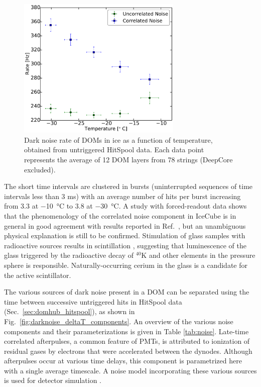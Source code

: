\begin{figure}
  \centering
  \includegraphics[width=0.7\textwidth]{graphics/dom/performance/darknoise/HitRatevsTemp_inice_nomuons_nofit_bigfont.pdf}
  \caption{Dark noise rate of DOMs in ice as a function of temperature,
    obtained from untriggered HitSpool data. Each data point represents the
    average of 12 DOM layers from 78 strings (DeepCore excluded).} 
  \label{fig:dom_darknoise_vs_temperature}
\end{figure}

The short time intervals are clustered in bursts (uninterrupted sequences
of time intervals less than 3 ms) with an average number of
hits per burst increasing from \num{3.3} at \SI{-10}{\celsius} to \num{3.8} at
\SI{-30}{\celsius}. A study with forced-readout data shows that the
phenomenology of the correlated noise component in IceCube is in general in
good agreement with results reported in Ref.~\cite{meyer_noise}, but an
unambiguous physical explanation is still to be confirmed.  Stimulation of
glass samples with radioactive sources results in scintillation
\cite{helbing_glass}, suggesting that luminescence of the glass triggered
by the radioactive decay of $^{40}\mathrm{K}$ and other elements in the
pressure sphere is responsible.  Naturally-occurring cerium in the glass is
a candidate for the active scintillator. 

The various sources of dark noise present in a DOM can be separated using
the time between successive untriggered hits in HitSpool 
data (Sec.~\ref{sec:domhub_hitspool}), as shown in 
Fig.~\ref{fig:darknoise_deltaT_components}. An overview of the various 
noise components and their parameterizations is given in Table \ref{tab:noise}.  Late-time
correlated afterpulses, a common feature of PMTs, is attributed to
ionization of residual gases by electrons that were accelerated between
the dynodes.  Although afterpulses occur at various time delays, this
component is parametrized here with a single average timescale.  A
noise model incorporating these various sources is used for detector
simulation \cite{larson2013simulation}. 

